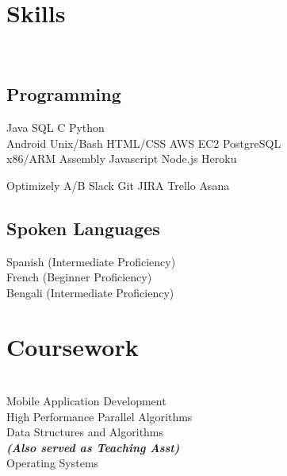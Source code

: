 \documentclass[]{deedy-resume-openfont}
\begin{document}
\begin{minipage}[t]{0.31\textwidth}
\section{Skills}
\\[1\baselineskip]
\subsection{Programming}

Java \textbullet{}  SQL  \textbullet{} C \textbullet{} Python
\\[1\baselineskip]

Android  \textbullet{}  Unix/Bash \textbullet{} HTML/CSS \textbullet{} AWS EC2 \textbullet{} PostgreSQL
\\[1\baselineskip]

x86/ARM Assembly \textbullet{}  Javascript \textbullet{}  Node.js \textbullet{}  Heroku
\sectionsep

Optimizely A/B \textbullet{}  Slack \textbullet{}  Git \textbullet{}  JIRA \textbullet{}  Trello \textbullet{}  Asana
\sectionsep

\subsection{Spoken Languages}
Spanish (Intermediate Proficiency) \\
French (Beginner Proficiency)\\
Bengali (Intermediate Proficiency)\\
[1\baselineskip]


\section{Coursework}
\\[1\baselineskip]
Mobile Application Development\\
High Performance Parallel Algorithms \\
Data Structures and Algorithms\\
{\footnotesize \textit{\textbf{(Also served as Teaching Asst) }}} \\
Operating Systems\\
\sectionsep

%
%

\end{minipage} 
\end{document}
